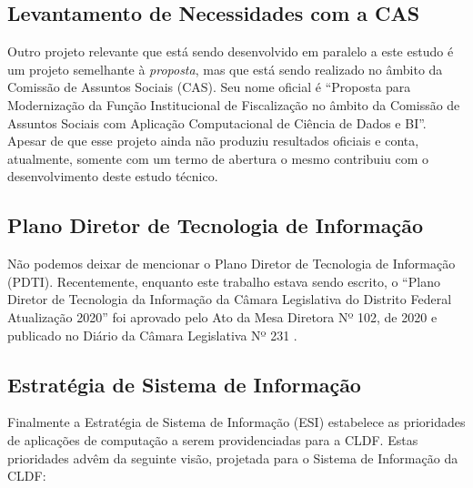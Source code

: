 \subsection{Levantamento de Necessidades com a CAS}

    Outro projeto relevante que está sendo desenvolvido em paralelo a este estudo é um projeto semelhante à \emph{proposta}, mas que está sendo realizado no âmbito da Comissão de Assuntos Sociais (CAS). Seu nome oficial é ``Proposta para Modernização da Função Institucional de Fiscalização no âmbito da Comissão de Assuntos Sociais com Aplicação Computacional de Ciência de Dados e BI''. Apesar de que esse projeto ainda não produziu resultados oficiais e conta, atualmente, somente com um termo de abertura \cite{propostaCAS} o mesmo contribuiu com o desenvolvimento deste estudo técnico.

\subsection{Plano Diretor de Tecnologia de Informação}
    Não podemos deixar de mencionar o Plano Diretor de Tecnologia de Informação (PDTI). Recentemente, enquanto este trabalho estava sendo escrito, o ``Plano Diretor de Tecnologia da Informação da Câmara Legislativa do Distrito Federal Atualização 2020'' foi aprovado pelo Ato da Mesa Diretora Nº 102, de 2020 e publicado no Diário da Câmara Legislativa Nº 231 \cite{pdti2020}.
 

\subsection{Estratégia de Sistema de Informação}
    Finalmente a Estratégia de Sistema de Informação (ESI) \cite{asiESI} estabelece as prioridades de aplicações de computação a serem providenciadas para a CLDF. Estas prioridades advêm da seguinte visão, projetada para o Sistema de Informação da CLDF: 
    
